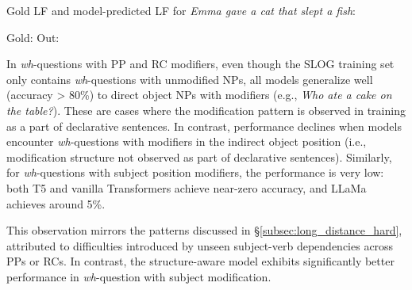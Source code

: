  \begin{exe}
\ex \label{ex:iobj_RC_error} Gold LF and model-predicted LF for \textit{Emma gave a cat that slept a fish}:
    \begin{xlist}
        \small{
        \ex \label{ex:iobj_a_dobj_gold_RC} Gold: 
    \ex \label{ex:iobj_a_dobj_pred_RC} Out: 
    }
    \end{xlist}
\end{exe}

In \emph{wh}-questions with PP and RC modifiers, even though the SLOG training set only contains \emph{wh}-questions with unmodified NPs, all models generalize well (accuracy > 80\%) to direct object NPs with modifiers (e.g., \textit{Who ate a cake on the table?}). These are cases where the modification pattern is observed in training as a part of declarative sentences. In contrast, performance declines when models encounter \emph{wh}-questions with modifiers in the indirect object position (i.e., modification structure not observed as part of declarative sentences). Similarly, for \emph{wh}-questions with subject position modifiers, the performance is very low: both T5 and vanilla Transformers achieve near-zero accuracy, and LLaMa achieves around 5\%.

This observation mirrors the patterns discussed in \S\ref{subsec:long_distance_hard}, attributed to difficulties introduced by unseen subject-verb dependencies across PPs or RCs. In contrast, the structure-aware model exhibits significantly better performance in \textit{wh}-question with subject modification.

